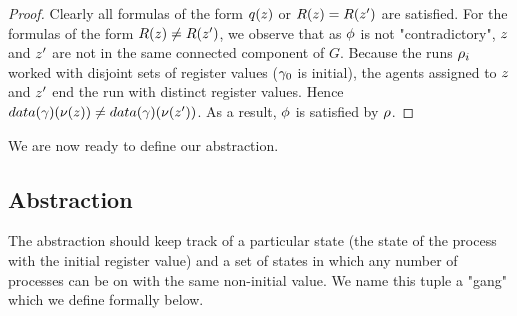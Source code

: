 \begin{proof}
	
	Clearly all formulas of the form $q(\varz)$ or $R(\varz) = R(\varz')$ are satisfied.
	For the formulas of the form $R(\varz) \neq R(\varz')$, we observe that as $\phi$ is not "contradictory", $\varz$ and $\varz'$ are not in the same connected component of $G$. Because the runs $\rho_i$ worked with disjoint sets of register values ($\gamma_0$ is initial), the agents assigned to $\varz$ and $\varz'$ end the run with distinct register values.
	Hence $\data{\config}(\nu(\varz)) \neq \data{\config}(\nu(\varz'))$. As a result, $\phi$ is satisfied by $\rho$.
\end{proof}
\fi


We are now ready to define our abstraction.

\subsection{Abstraction}
\label{sec:abstraction}

The abstraction should keep track of a particular state (the state of the process with the initial register value) and a set of states in which any number of processes can be on with the same non-initial value. We name this tuple a "gang" which we define formally below.

